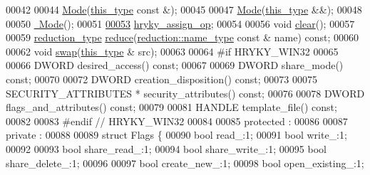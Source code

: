 \begin{DoxyCode}
00042 
00044     \hyperlink{classhryky_1_1file_1_1descriptor_1_1_mode_a86f797b62eb4fdd0cb39bd7f82a92ddf}{Mode}(\hyperlink{classhryky_1_1file_1_1descriptor_1_1_mode}{this_type} \textcolor{keyword}{const} &);
00045 
00047     \hyperlink{classhryky_1_1file_1_1descriptor_1_1_mode_a86f797b62eb4fdd0cb39bd7f82a92ddf}{Mode}(\hyperlink{classhryky_1_1file_1_1descriptor_1_1_mode}{this_type} &&);
00048 
00050     \hyperlink{classhryky_1_1file_1_1descriptor_1_1_mode_a4ba0ea00e138073c98a8f4a2b7194d92}{~Mode}();
00051 
\hypertarget{file__descriptor__mode_8h_source_l00053}{}\hyperlink{classhryky_1_1file_1_1descriptor_1_1_mode_a2668dae2a013ae1932819d22a121adb8}{00053}     \hyperlink{classhryky_1_1file_1_1descriptor_1_1_mode_a2668dae2a013ae1932819d22a121adb8}{hryky_assign_op};
00054 
00056     \textcolor{keywordtype}{void} \hyperlink{classhryky_1_1file_1_1descriptor_1_1_mode_a56f17b65836a3add1b908e2df24b126f}{clear}();
00057 
00059     \hyperlink{classhryky_1_1_intrusive_ptr}{reduction_type} \hyperlink{classhryky_1_1file_1_1descriptor_1_1_mode_afa930c7576622d0def066d6ce3b0894f}{reduce}(\hyperlink{classhryky_1_1reduction_1_1_string}{reduction::name_type} \textcolor{keyword}{const} & name) \textcolor{keyword}{const};
00060 
00062     \textcolor{keywordtype}{void} \hyperlink{classhryky_1_1file_1_1descriptor_1_1_mode_a294fd4f518b15bb59bedba3d5c2484bb}{swap}(\hyperlink{classhryky_1_1file_1_1descriptor_1_1_mode}{this_type} & src);
00063 
00064 \textcolor{preprocessor}{#if HRYKY\_WIN32}
00065 \textcolor{preprocessor}{}
00066     DWORD desired\_access() \textcolor{keyword}{const};
00067 
00069     DWORD share\_mode() \textcolor{keyword}{const};
00070 
00072     DWORD creation\_disposition() \textcolor{keyword}{const};
00073 
00075     SECURITY\_ATTRIBUTES * security\_attributes() \textcolor{keyword}{const};
00076 
00078     DWORD flags\_and\_attributes() \textcolor{keyword}{const};
00079 
00081     HANDLE template\_file() \textcolor{keyword}{const};
00082 
00083 \textcolor{preprocessor}{#endif // HRYKY\_WIN32}
00084 \textcolor{preprocessor}{}
00085 \textcolor{keyword}{protected} :
00086 
00087 \textcolor{keyword}{private} :
00088 
00089     \textcolor{keyword}{struct }Flags \{
00090         \textcolor{keywordtype}{bool} read\_:1;
00091         \textcolor{keywordtype}{bool} write\_:1;
00092         
00093         \textcolor{keywordtype}{bool} share\_read\_:1;
00094         \textcolor{keywordtype}{bool} share\_write\_:1;
00095         \textcolor{keywordtype}{bool} share\_delete\_:1;
00096 
00097         \textcolor{keywordtype}{bool} create\_new\_:1;
00098         \textcolor{keywordtype}{bool} open\_existing\_:1;

\end{DoxyCode}
